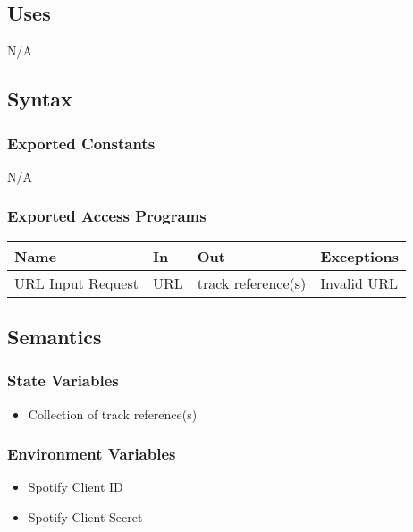 \documentclass[12pt, titlepage]{article}
\begin{document}
\subsection{Uses}
N/A

\subsection{Syntax}

\subsubsection{Exported Constants}
N/A 

\subsubsection{Exported Access Programs}

\begin{center}
\begin{tabular}{p{2cm} p{4cm} p{4cm} p{2cm}}
\hline
\textbf{Name} & \textbf{In} & \textbf{Out} & \textbf{Exceptions}\\
\hline%
URL Input Request &URL &track reference(s) &Invalid URL\\

\hline
\end{tabular}
\end{center}

\subsection{Semantics}

\subsubsection{State Variables}
\begin{itemize}
  \item Collection of track reference(s)
\end{itemize}

\subsubsection{Environment Variables}
\begin{itemize}
  \item Spotify Client ID
  \item Spotify Client Secret
\end{itemize}
\end{document}
